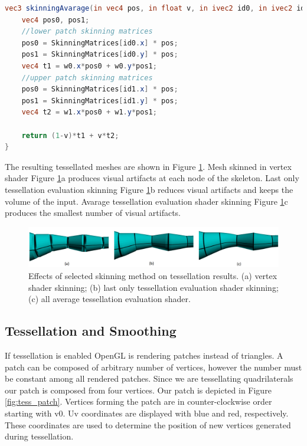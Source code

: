 \linespread{1.2}
\begin{lstlisting}[language=GLSL,caption={Linear Blend Skinning implemented in tessellation evaluation shader, with avaraging of skinning information from all patch vertices.},label={lst:te_avg_skin}]
vec3 skinningAvarage(in vec4 pos, in float v, in ivec2 id0, in ivec2 id1, in vec2 w0, in vec2 w1, in mat4 SkinningMatrices[SKINNING_MATRICES]) {
	vec4 pos0, pos1;
	//lower patch skinning matrices
	pos0 = SkinningMatrices[id0.x] * pos;
	pos1 = SkinningMatrices[id0.y] * pos;
	vec4 t1 = w0.x*pos0 + w0.y*pos1;
	//upper patch skinning matrices
	pos0 = SkinningMatrices[id1.x] * pos;
	pos1 = SkinningMatrices[id1.y] * pos;
	vec4 t2 = w1.x*pos0 + w1.y*pos1;

	return (1-v)*t1 + v*t2;
}
\end{lstlisting} 
\linespread{1.5}

The resulting tessellated meshes are shown in Figure \ref{fig:tess_skin_comp}.
Mesh skinned in vertex shader Figure \ref{fig:tess_skin_comp}a produces visual artifacts at each node of the skeleton.
Last only tessellation evaluation skinning Figure \ref{fig:tess_skin_comp}b reduces visual artifacts and keeps the volume of the input.
Avarage tessellation evaluation shader skinning Figure \ref{fig:tess_skin_comp}c produces the smallest number of visual artifacts.

\begin{figure}[h]
    \centering
    \includegraphics[width=\textwidth]{images/tess_comp}
    \caption[Skinning and Tessellation]{Effects of selected skinning method on tessellation results. (a) vertex shader skinning; (b) last only tessellation evaluation shader skinning; (c) all average tessellation evaluation shader.}
    \label{fig:tess_skin_comp}
\end{figure}

\subsection{Tessellation and Smoothing}

If tessellation is enabled OpenGL is rendering patches instead of triangles.
A patch can be composed of arbitrary number of vertices, however the number must be constant among all rendered patches.
Since we are tessellating quadrilaterals our patch is composed from four vertices.
Our patch is depicted in Figure \ref{fig:tess_patch}.
Vertices forming the patch are in counter-clockwise order starting with v0.
Uv coordinates are displayed with blue and red, respectively.
These coordinates are used to determine the position of new vertices generated during tessellation.

